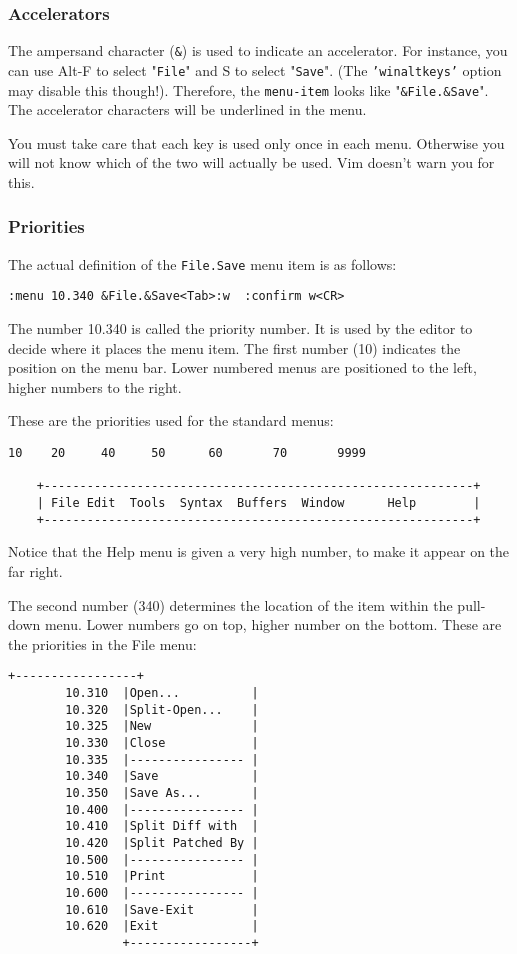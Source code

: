 \subsubsection{Accelerators}
The ampersand character (\texttt{\&}) is used to indicate an accelerator.
For instance, you can use Alt-F to select "\texttt{File}" and S to select "\texttt{Save}".
(The \texttt{'winaltkeys'} option may disable this though!).
Therefore, the \texttt{{menu-item}} looks like "\texttt{\&File.\&Save}".
The accelerator characters will be underlined in the menu.

You must take care that each key is used only once in each menu.
Otherwise you will not know which of the two will actually be used.
Vim doesn't warn you for this.

\subsubsection{Priorities}
The actual definition of the \texttt{File.Save} menu item is as follows:

\begin{Verbatim}[samepage=true]
 :menu 10.340 &File.&Save<Tab>:w  :confirm w<CR>
\end{Verbatim}

The number 10.340 is called the priority number.
It is used by the editor to decide where it places the menu item.
The first number (10) indicates the position on the menu bar.
Lower numbered menus are positioned to the left, higher numbers to the right.

These are the priorities used for the standard menus:

\begin{Verbatim}[samepage=true]
      10    20     40     50      60       70       9999

    +------------------------------------------------------------+
    | File Edit  Tools  Syntax  Buffers  Window      Help        |
    +------------------------------------------------------------+
\end{Verbatim}

Notice that the Help menu is given a very high number, to make it appear on the far right.

The second number (340) determines the location of the item within the pull-down menu.
Lower numbers go on top, higher number on the bottom.
These are the priorities in the File menu:

\begin{Verbatim}[samepage=true]
                +-----------------+
        10.310  |Open...          |
        10.320  |Split-Open...    |
        10.325  |New              |
        10.330  |Close            |
        10.335  |---------------- |
        10.340  |Save             |
        10.350  |Save As...       |
        10.400  |---------------- |
        10.410  |Split Diff with  |
        10.420  |Split Patched By |
        10.500  |---------------- |
        10.510  |Print            |
        10.600  |---------------- |
        10.610  |Save-Exit        |
        10.620  |Exit             |
                +-----------------+
\end{Verbatim}

